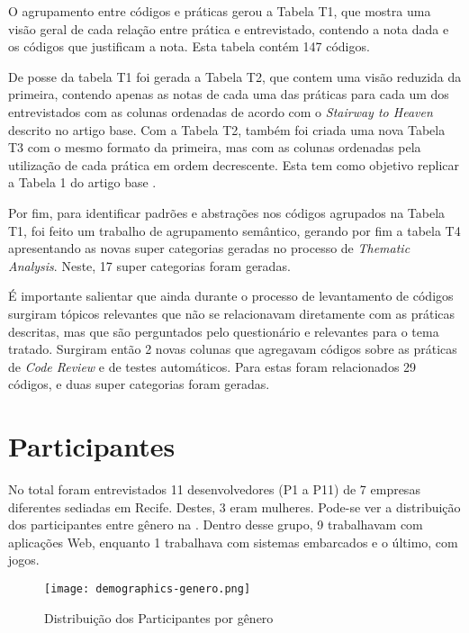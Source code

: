 O agrupamento entre códigos e práticas gerou a Tabela T1, que mostra uma visão geral de cada relação entre prática e entrevistado, contendo a nota dada e os códigos que justificam a nota. Esta tabela contém 147 códigos.



De posse da tabela T1 foi gerada a Tabela T2, que contem uma visão reduzida da primeira, contendo apenas as notas de cada uma das práticas para cada um dos entrevistados com as colunas ordenadas de acordo com o \emph{Stairway to Heaven} descrito no artigo base. Com a Tabela T2, também foi criada uma nova Tabela T3 com o mesmo formato da primeira, mas com as colunas ordenadas pela utilização de cada prática em ordem decrescente. Esta tem como objetivo replicar a Tabela 1 do artigo base \cite{empiricalStudy2016}.

Por fim, para identificar padrões e abstrações nos códigos agrupados na Tabela T1, foi feito um trabalho de agrupamento semântico, gerando por fim a tabela T4 apresentando as novas super categorias geradas no processo de \emph{Thematic Analysis}. Neste, 17 super categorias foram geradas.

É importante salientar que ainda durante o processo de levantamento de códigos surgiram tópicos relevantes que não se relacionavam diretamente com as práticas descritas, mas que são perguntados pelo questionário e relevantes para o tema tratado. Surgiram então 2 novas colunas que agregavam códigos sobre as práticas de \emph{Code Review} e de testes automáticos. Para estas foram relacionados 29 códigos, e duas super categorias foram geradas.



\section{Participantes}

No total foram entrevistados 11 desenvolvedores (P1 a P11) de 7 empresas diferentes sediadas em Recife. Destes, 3 eram mulheres. Pode-se ver a distribuição dos participantes entre gênero na . Dentro desse grupo, 9 trabalhavam com aplicações Web, enquanto 1 trabalhava com sistemas embarcados e o último, com jogos.

\begin{figure}[ht]
\begin{center}
\texttt{[image: demographics-genero.png]}
\end{center}
\caption[Distribuição dos Participantes por gênero]{
    Distribuição dos Participantes por gênero
}\label{genero}
\end{figure}

